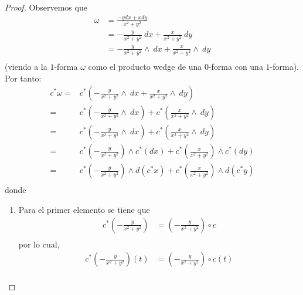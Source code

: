 \documentclass[12pt]{report}
\theoremstyle{largebreak}
\begin{document}
    \begin{proof}
        Observemos que
        \begin{equation*}
            \begin{split}
                \omega&=\frac{-ydx+xdy}{x^2+y^2}\\
                &=-\frac{y}{x^2+y^2}\:dx+\frac{x}{x^2+y^2}\:dy\\
                &=-\frac{y}{x^2+y^2}\wedge\:dx+\frac{x}{x^2+y^2}\wedge\:dy\\
            \end{split}
        \end{equation*}
        (viendo a la $1$-forma $\omega$ como el producto wedge de una $0$-forma con una $1$-forma). Por tanto:
        \begin{equation*}
            \begin{split}
                c^*\omega=&c^*\left(-\frac{y}{x^2+y^2}\wedge\:dx+\frac{x}{x^2+y^2}\wedge\:dy\right) \\
                =&c^*\left(-\frac{y}{x^2+y^2}\wedge\:dx\right)+c^*\left(\frac{x}{x^2+y^2}\wedge\:dy\right) \\
                =&c^*\left(-\frac{y}{x^2+y^2}\wedge\:dx\right)+c^*\left(\frac{x}{x^2+y^2}\wedge\:dy\right) \\
                =&c^*\left(-\frac{y}{x^2+y^2}\right)\wedge c^*\left(dx\right)+c^*\left(\frac{x}{x^2+y^2}\right)\wedge c^*\left(dy\right) \\
                =&c^*\left(-\frac{y}{x^2+y^2}\right)\wedge d\left(c^*x\right)+c^*\left(\frac{x}{x^2+y^2}\right)\wedge d\left(c^*y\right) \\
            \end{split}
        \end{equation*}
        donde
        \begin{enumerate}
            \item Para el primer elemento se tiene que
            \begin{equation*}
                \begin{split}
                    c^*\left(-\frac{y}{x^2+y^2}\right)&=\left(-\frac{y}{x^2+y^2}\right)\circ c\\
                \end{split}
            \end{equation*}
            por lo cual,
            \begin{equation*}
                \begin{split}
                    c^*\left(-\frac{y}{x^2+y^2}\right)(t)&=\left(-\frac{y}{x^2+y^2}\right)\circ c(t)\\

\end{split}
\end{equation*}
\end{enumerate}
\end{proof}
\end{document}
